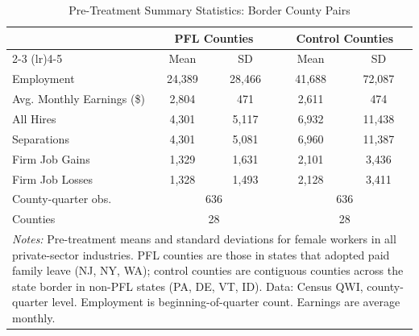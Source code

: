 \begin{table}[htbp]
\centering
\caption{Pre-Treatment Summary Statistics: Border County Pairs}
\label{tab:sumstats}
\begin{tabular}{lcccc}
\hline\hline
 & \multicolumn{2}{c}{PFL Counties} & \multicolumn{2}{c}{Control Counties} \\
\cmidrule(lr){2-3} \cmidrule(lr){4-5}
 & Mean & SD & Mean & SD \\
\hline
Employment & 24,389 & 28,466 & 41,688 & 72,087 \\
Avg. Monthly Earnings (\$) & 2,804 & 471 & 2,611 & 474 \\
All Hires & 4,301 & 5,117 & 6,932 & 11,438 \\
Separations & 4,301 & 5,081 & 6,960 & 11,387 \\
Firm Job Gains & 1,329 & 1,631 & 2,101 & 3,436 \\
Firm Job Losses & 1,328 & 1,493 & 2,128 & 3,411 \\
\hline
County-quarter obs. & \multicolumn{2}{c}{636} & \multicolumn{2}{c}{636} \\
Counties & \multicolumn{2}{c}{28} & \multicolumn{2}{c}{28} \\
\hline\hline
\multicolumn{5}{p{0.85\textwidth}}{\footnotesize \textit{Notes:} Pre-treatment means and standard deviations for female workers in all private-sector industries. PFL counties are those in states that adopted paid family leave (NJ, NY, WA); control counties are contiguous counties across the state border in non-PFL states (PA, DE, VT, ID). Data: Census QWI, county-quarter level. Employment is beginning-of-quarter count. Earnings are average monthly.} \\
\end{tabular}
\end{table}
